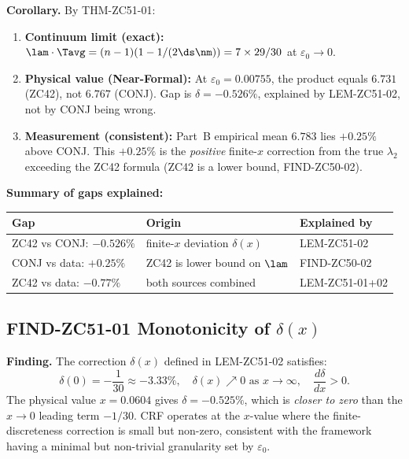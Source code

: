 \documentclass[12pt, a4paper]{article}
\begin{document}
\begin{formalbox}[title={COR-ZC51-01: CONJ-ZC50-01 is Exact at
  Continuum Limit; Near-Formal at Physical $\varepsilon_0$}]
\textbf{Corollary.}
By THM-ZC51-01:
\begin{enumerate}[leftmargin=2em]
\item \textbf{Continuum limit (exact):}
  $\lam\cdot\Tavg = (n-1)(1-1/(2\ds\nm)) = 7\times 29/30$
  at $\varepsilon_0\to 0$.
\item \textbf{Physical value (Near-Formal):}
  At $\varepsilon_0 = 0.00755$, the product equals
  $6.731$ (ZC42), not $6.767$ (CONJ). Gap is $\delta = -0.526\%$,
  explained by LEM-ZC51-02, not by CONJ being wrong.
\item \textbf{Measurement (consistent):}
  Part~B empirical mean $6.783$ lies $+0.25\%$ above CONJ.
  This $+0.25\%$ is the \emph{positive} finite-$x$ correction
  from the true $\lambda_2$ exceeding the ZC42 formula
  (ZC42 is a lower bound, FIND-ZC50-02).
\end{enumerate}

\textbf{Summary of gaps explained:}
\begin{center}
\begin{tabular}{@{}lll@{}}
\toprule
Gap & Origin & Explained by \\
\midrule
ZC42 vs CONJ: $-0.526\%$ & finite-$x$ deviation $\delta(x)$ & LEM-ZC51-02 \\
CONJ vs data: $+0.25\%$ & ZC42 is lower bound on $\lam$ & FIND-ZC50-02 \\
ZC42 vs data: $-0.77\%$ & both sources combined & LEM-ZC51-01+02 \\
\bottomrule
\end{tabular}
\end{center}
\end{formalbox}

\subsection{FIND-ZC51-01 \quad Monotonicity of $\delta(x)$}

\begin{derivedbox}[title={FIND-ZC51-01: $\delta(x)$ is Monotone;
  Physical Gap is Minimal Along CRF Curve}]
\textbf{Finding.}
The correction $\delta(x)$ defined in LEM-ZC51-02 satisfies:
\[
  \delta(0) = -\frac{1}{30} \approx -3.33\%, \quad
  \delta(x) \nearrow 0 \text{ as } x \to \infty, \quad
  \frac{d\delta}{dx} > 0.
\]
The physical value $x=0.0604$ gives $\delta = -0.525\%$, which
is \emph{closer to zero} than the $x\to 0$ leading term $-1/30$.
CRF operates at the $x$-value where the finite-discreteness
correction is small but non-zero, consistent with the framework
having a minimal but non-trivial granularity set by $\varepsilon_0$.
\end{derivedbox}
\end{document}
